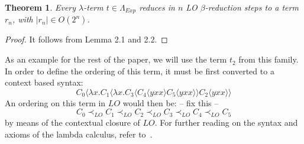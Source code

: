\message{ !name(VU-CS-BSc-thesis-template.tex)}\documentclass[11pt]{article}
\newtheorem{theorem}{Theorem}[section]
\begin{document}
\begin{theorem}
Every $\lambda$-term $t \in \Lambda_{Exp}$ reduces in $n$ LO $\beta$-reduction steps to a term $r_n$, with $|r_n| \in O(2^n)$.
\end{theorem}
\begin{proof}
It follows from Lemma 2.1 and 2.2.
\end{proof}

As an example for the rest of the paper, we will use the term $t_{2}$ from this family. In order to define the ordering of this term, it must be first converted to a context based syntax:
\[ C_{0} \langle \lambda x. C_{1} \langle \lambda x. C_{3} \langle C_{4} \langle yxx \rangle C_{5} \langle yxx \rangle \rangle C_{2} \langle yxx \rangle \rangle \]
An ordering on this term in $LO$ would then be: -- fix this --
\begin{equation}
 C_{0} \prec_{LO} C_{1} \prec_{LO} C_{2} \prec_{LO} C_{3} \prec_{LO} C_{4} \prec_{LO} C_{5}
\end{equation}
by means of the contextual closure of $LO$.
For further reading on the syntax and axioms of the lambda calculus, refer to~\cite{barendregt1984lambda}.
\end{document}
